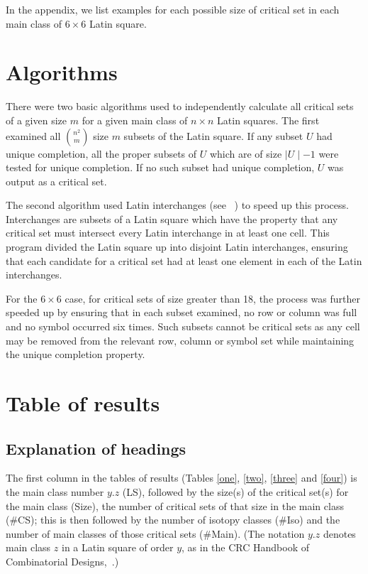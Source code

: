 In the appendix, we list examples for each possible size of critical set in
each main class of $6 \times 6$ Latin square.

\vspace{5mm}

\section{Algorithms}

There were two basic algorithms used to independently calculate all critical sets
of a given size $m$ for a given main class of $n \times n$ Latin squares.  
The first examined all ${n^2 \choose m}$
size $m$ subsets of the
Latin square.  If any subset $U$ had unique completion, all the proper
subsets of $U$ which are of size $\mid U \mid -1$ were tested for
unique completion.  If no such subset had unique completion, $U$ was output
as a critical set.

The second algorithm used Latin interchanges (see ~\cite{MR98b:05019})
to speed up this process.  Interchanges are subsets of a Latin square
which have the property that any critical set must intersect every 
Latin interchange in at least one cell.  This program divided the Latin square
up into disjoint Latin interchanges, ensuring that each candidate for a
critical set had at least one element in each of the Latin interchanges.

For the $6 \times 6$ case, for critical sets of size greater than 18,
the process was further speeded up by ensuring that in
each subset examined, no row or column was full and no symbol 
occurred six times.  Such subsets cannot be critical sets as any
cell may be removed from the relevant row, column or symbol set
while maintaining the unique completion property.


\section{Table of results}

\subsection{Explanation of headings}
The first column in the tables of results (Tables \ref{one}, \ref{two}, 
\ref{three} and \ref{four}) is
the main class number $y.z$ (LS), followed by the size(s) of the critical
set(s) for the main class (Size), the number of critical sets of that
size in the main class (\#CS); this is then followed by the number of
isotopy classes (\#Iso) and the number of main classes of those critical sets (\#Main).
(The notation $y.z$ denotes main class $z$ in
a Latin square of order $y$, as in the CRC Handbook of Combinatorial
Designs,~\cite{crc}.)  

